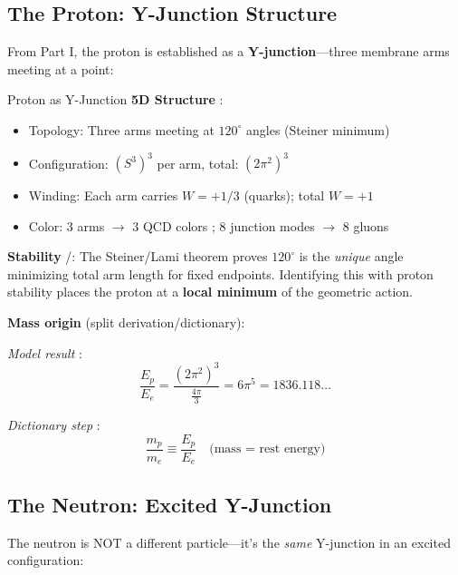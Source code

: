 \subsection{The Proton: Y-Junction Structure}

From Part I, the proton is established as a \textbf{Y-junction}---three membrane
arms meeting at a point:

\begin{mechanism}{Proton as Y-Junction}
\textbf{5D Structure} \tagP{}:
\begin{itemize}[nosep]
\item Topology: Three arms meeting at $120^\circ$ angles (Steiner minimum)
\item Configuration: $(S^3)^3$ per arm, total: $(2\pi^2)^3$
\item Winding: Each arm carries $W = +1/3$ (quarks); total $W = +1$
\item Color: 3 arms $\to$ 3 QCD colors \tagI{}; 8 junction modes $\to$ 8 gluons \tagI{}
\end{itemize}

\textbf{Stability} \tagM{}/\tagI{}:
The Steiner/Lami theorem \tagM{} proves $120^\circ$ is the \textit{unique} angle
minimizing total arm length for fixed endpoints. Identifying this
with proton stability \tagI{} places the proton at a \textbf{local minimum} of the geometric action.

\textbf{Mass origin} (split derivation/dictionary):

\textit{Model result} \tagDerSym{}:
\begin{equation}
\frac{E_p}{E_e} = \frac{(2\pi^2)^3}{\frac{4\pi}{3}} = 6\pi^5 = 1836.118\ldots
\end{equation}

\textit{Dictionary step} \tagDc{}:
\begin{equation}
\frac{m_p}{m_e} \equiv \frac{E_p}{E_e} \quad\text{(mass = rest energy)}
\end{equation}
\end{mechanism}

\subsection{The Neutron: Excited Y-Junction}

The neutron is NOT a different particle---it's the \textit{same} Y-junction
in an excited configuration:

